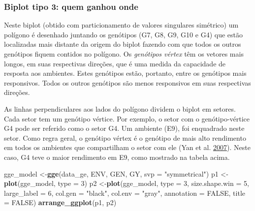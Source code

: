 \documentclass[
]{book}
\newenvironment{Shaded}{\begin{snugshade}}{\end{snugshade}}
\newcommand{\DataTypeTok}[1]{\textcolor[rgb]{0.13,0.29,0.53}{#1}}
\newcommand{\DecValTok}[1]{\textcolor[rgb]{0.00,0.00,0.81}{#1}}
\newcommand{\KeywordTok}[1]{\textcolor[rgb]{0.13,0.29,0.53}{\textbf{#1}}}
\newcommand{\NormalTok}[1]{#1}
\newcommand{\OtherTok}[1]{\textcolor[rgb]{0.56,0.35,0.01}{#1}}
\newcommand{\StringTok}[1]{\textcolor[rgb]{0.31,0.60,0.02}{#1}}
\numberwithin{equation}{section}
\newcommand{\indt}[1]{\index{#1|ST}}
\begin{document}
\hypertarget{biplot-tipo-3-quem-ganhou-onde}{%
\subsubsection{Biplot tipo 3: quem ganhou onde}\label{biplot-tipo-3-quem-ganhou-onde}}

Neste biplot (obtido com particionamento de valores singulares simétrico) um polígono é desenhado juntando os genótipos (G7, G8, G9, G10 e G4) que estão localizadas mais distante da origem do biplot fazendo com que todos os outros genótipos fiquem contidos no polígono. Os \emph{genótipos vértex} têm os vetores mais longos, em suas respectivas direções, que é uma medida da capacidade de resposta aos ambientes. Estes genótipos estão, portanto, entre os genótipos mais responsivos. Todos os outros genótipos são menos responsivos em suas respectivas direções.

As linhas perpendiculares aos lados do polígono dividem o biplot em setores. Cada setor tem um genótipo vértice. Por exemplo, o setor com o genótipo-vértice G4 pode ser referido como o setor G4. Um ambiente (E9), foi enquadrado neste setor. Como regra geral, o genótipo vértex é o genótipo de mais alto rendimento em todos os ambientes que compartilham o setor com ele (Yan et al. \protect\hyperlink{ref-Yan2007}{2007}). Neste caso, G4 teve o maior rendimento em E9, como mostrado na tabela acima.
\indt{biplot}

\begin{Shaded}
\begin{Highlighting}[]
\NormalTok{gge\_model \textless{}{-}}\KeywordTok{gge}\NormalTok{(data\_ge, ENV, GEN, GY, }\DataTypeTok{svp =} \StringTok{"symmetrical"}\NormalTok{)}
\NormalTok{p1 \textless{}{-}}\KeywordTok{plot}\NormalTok{(gge\_model, }\DataTypeTok{type =} \DecValTok{3}\NormalTok{)}
\NormalTok{p2 \textless{}{-}}\KeywordTok{plot}\NormalTok{(gge\_model,}
          \DataTypeTok{type =} \DecValTok{3}\NormalTok{,}
          \DataTypeTok{size.shape.win =} \DecValTok{5}\NormalTok{,}
          \DataTypeTok{large\_label =} \DecValTok{6}\NormalTok{,}
          \DataTypeTok{col.gen =} \StringTok{"black"}\NormalTok{,}
          \DataTypeTok{col.env =} \StringTok{"gray"}\NormalTok{,}
          \DataTypeTok{annotation =} \OtherTok{FALSE}\NormalTok{,}
          \DataTypeTok{title =} \OtherTok{FALSE}\NormalTok{)}
\KeywordTok{arrange\_ggplot}\NormalTok{(p1, p2)}
\end{Highlighting}
\end{Shaded}
\end{document}
